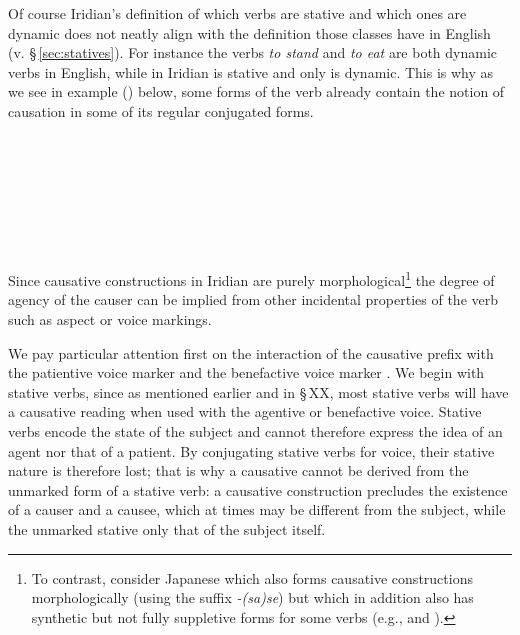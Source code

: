 Of course Iridian's definition of which verbs are stative and which ones are dynamic does not neatly align with the definition those classes have in English (v. \S\,\ref{sec:statives}). For instance the verbs \emph{to stand} and \emph{to eat} are both dynamic verbs in English, while in Iridian  is stative and only  is dynamic. This is why as we see in example () below, some forms of the verb  already contain the notion of causation in some of its regular conjugated forms.

\pex
\a  {}\\
	\\
    \\
    \\
\a  {}\\
    \\
\xe

Since causative constructions in Iridian are purely morphological\footnote{To contrast, consider Japanese which also forms causative constructions morphologically (using the suffix \emph{-(sa)se}) but which in addition also has synthetic but not fully suppletive forms for some verbs (e.g.,  and ).} the degree of agency of the causer can be implied from other incidental properties of the verb such as aspect or voice markings.

We pay particular attention first on the interaction of the causative prefix  with the patientive voice marker  and the benefactive voice marker . We begin with stative verbs, since as mentioned earlier and in \S\,XX, most stative verbs will have a causative reading when used with the agentive or benefactive voice. Stative verbs encode the state of the subject and cannot therefore express the idea of an agent nor that of a patient. By conjugating stative verbs for voice, their stative nature is therefore lost; that is why a causative cannot be derived from the unmarked form of a stative verb: a causative construction precludes the existence of a causer and a causee, which at times may be different from the subject, while the unmarked stative only that of the subject itself.



